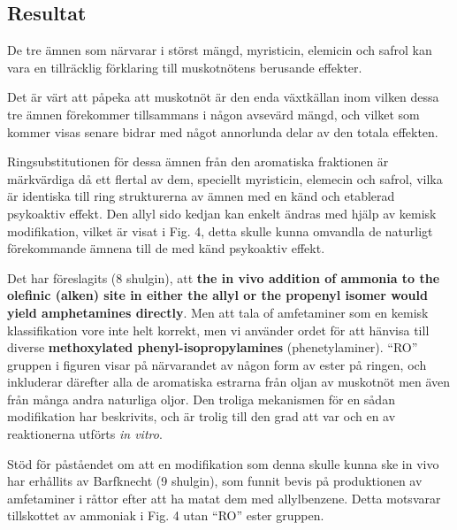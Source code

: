 \documentclass[a4paper,margin=3.25cm]{article}
\begin{document}
{%


	\subsection{Resultat}

	De tre ämnen som närvarar i störst mängd, myristicin, elemicin och safrol kan vara en tillräcklig förklaring till muskotnötens berusande effekter.

	Det är värt att påpeka att muskotnöt är den enda växtkällan inom vilken dessa
	tre ämnen förekommer tillsammans i någon avsevärd mängd, och vilket som kommer visas senare bidrar med något annorlunda delar av den totala effekten.

	Ringsubstitutionen för dessa ämnen från den aromatiska fraktionen är märkvärdiga då ett flertal av dem, speciellt myristicin, elemecin och safrol, vilka är identiska till ring strukturerna av ämnen med en känd och etablerad psykoaktiv effekt. Den allyl sido kedjan kan enkelt ändras med hjälp av kemisk modifikation, vilket är visat i Fig. 4, detta skulle kunna omvandla de naturligt förekommande ämnena till de med känd psykoaktiv effekt.

	Det har föreslagits (8 shulgin), att \textbf{the in vivo addition
	of ammonia to the olefinic (alken) site in either the allyl or the propenyl isomer would yield amphetamines directly}.
	Men att tala of amfetaminer som en kemisk klassifikation vore inte helt korrekt, men vi använder ordet för att hänvisa till diverse
	\textbf{methoxylated phenyl-isopropylamines} (phenetylaminer).
	``RO'' gruppen i figuren visar på närvarandet av någon form av ester på ringen,
	och inkluderar därefter alla de aromatiska estrarna från oljan av muskotnöt men även
	från många andra naturliga oljor.
	Den troliga mekanismen för en sådan  modifikation har beskrivits,
	och är trolig till den grad att var och en av reaktionerna utförts \textit{in vitro}.

	Stöd för påståendet om att en modifikation som denna skulle kunna ske in vivo har erhållits
	av Barfknecht (9 shulgin), som funnit bevis på produktionen av amfetaminer i råttor
	efter att ha matat dem med allylbenzene. Detta motsvarar tillskottet av
	ammoniak i Fig. 4 utan ``RO'' ester gruppen.




}
\end{document}
